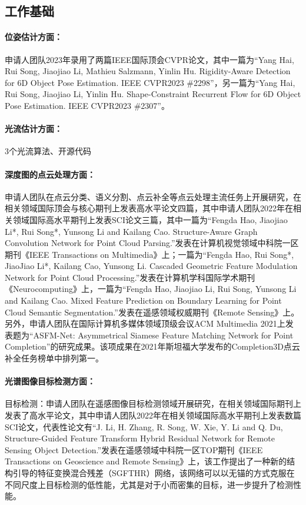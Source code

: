 \documentclass[12pt]{article}
\newcommand{\myPara}[1]{\paragraph{#1：}}
\begin{document}

\subsection{工作基础}


\myPara{位姿估计方面}申请人团队2023年录用了两篇IEEE国际顶会CVPR论文，其中一篇为“Yang Hai, Rui Song, Jiaojiao Li, Mathieu Salzmann, Yinlin Hu. Rigidity-Aware Detection for 6D Object Pose Estimation. IEEE CVPR2023 \#2298”，另一篇为“Yang Hai, Rui Song, Jiaojiao Li, Yinlin Hu. Shape-Constraint Recurrent Flow for 6D Object Pose Estimation. IEEE CVPR2023 \#2307”。

\myPara{光流估计方面}
3个光流算法、开源代码

\myPara{深度图的点云处理方面}申请人团队在点云分类、语义分割、点云补全等点云处理主流任务上开展研究，在相关领域国际顶会与核心期刊上发表高水平论文四篇，其中申请人团队2022年在相关领域国际高水平期刊上发表SCI论文三篇，其中一篇为“Fengda Hao, Jiaojiao Li*, Rui Song*, Yunsong Li and Kailang Cao. Structure-Aware Graph Convolution Network for Point Cloud Parsing.”发表在计算机视觉领域中科院一区期刊《IEEE Transactions on Multimedia》上；一篇为“Fengda Hao, Rui Song*, JiaoJiao Li*, Kailang Cao, Yunsong Li. Cascaded Geometric Feature Modulation Network for Point Cloud Processing.”发表在计算机学科国际学术期刊《Neurocomputing》上，一篇为“Fengda Hao, Jiaojiao Li, Rui Song, Yunsong Li and Kailang Cao. Mixed Feature Prediction on Boundary Learning for Point Cloud Semantic Segmentation.”发表在遥感领域权威期刊《Remote Sensing》上。另外，申请人团队在国际计算机多媒体领域顶级会议ACM Multimedia 2021上发表题为“ASFM-Net: Asymmetrical Siamese Feature Matching Network for Point Completion”的研究成果。该项成果在2021年斯坦福大学发布的Completion3D点云补全任务榜单中排列第一。

\myPara{光谱图像目标检测方面}
目标检测：申请人团队在遥感图像目标检测领域开展研究，在相关领域国际期刊上发表了高水平论文，其中申请人团队2022年在相关领域国际高水平期刊上发表数篇SCI论文，代表性论文有“J. Li, H. Zhang, R. Song, W. Xie, Y. Li and Q. Du, Structure-Guided Feature Transform Hybrid Residual Network for Remote Sensing Object Detection.”发表在遥感领域中科院一区TOP期刊《IEEE Transactions on Geoscience and Remote Sensing》上，该工作提出了一种新的结构引导的特征变换混合残差（SGFTHR）网络，该网络可以以无锚的方式克服在不同尺度上目标检测的低性能，尤其是对于小而密集的目标，进一步提升了检测性能。
\end{document}
